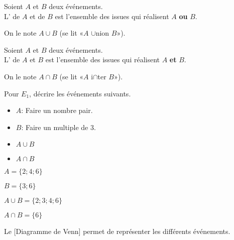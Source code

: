 \begin{definition}[Union]
    Soient $A$ et $B$ deux événements.\\
     L' de $A$ et de $B$ est l'ensemble
des issues qui réalisent $A$ \textbf{ou} $B$.

On le note $A\cup B$ (se lit «$A$ $\cup$nion $B$»).
\end{definition}


\begin{definition}[Intersection]
    Soient $A$ et $B$ deux événements.\\
     L' de $A$ et $B$ est
l'ensemble des issues qui réalisent $A$ \textbf{et } $B$.

On le note $A\cap B$ (se lit «$A$ i$\cap$ter $B$»).
\end{definition}

\begin{exemple} Pour $E_1$, décrire les événements suivants.
\begin{itemize}
 \item $A$: \og Faire un nombre pair\fg.
\item $B$:  \og Faire un multiple de 3\fg.
\item $A\cup B$
\item $A\cap B$
\end{itemize}

\correction
\begin{colitemize}{2}
 \item $A=\{2;4;6\}$ \item $B=\{3; 6\}$ \item $A\cup B=\{2; 3; 4; 6\}$ \item $A\cap B=\{6\}$
 \end{colitemize}
\end{exemple}
\begin{remarque} Le [Diagramme de Venn]{} permet de représenter les différents événements.
\begin{center}
\end{center}
\end{remarque}


